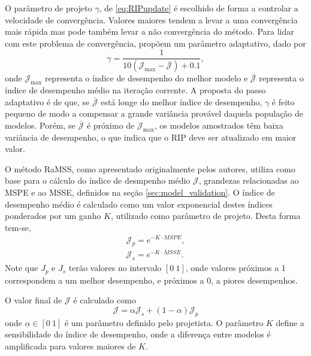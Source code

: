 O parâmetro de projeto $\gamma$, de  \eqref{eq:RIPupdate} é escolhido de forma a controlar a velocidade de convergência. Valores maiores tendem a levar a uma convergência mais rápida mas pode também levar a não convergência do método. Para lidar com este problema de convergência, \cite{falsone2015} propõem um parâmetro adaptativo, dado por
\begin{equation}
   \gamma = \frac{1}{10(\mathcal{J}_{\max}- \bar{\mathcal{J}}) + 0.1}, 
\label{eq:gamma}
\end{equation}
onde $\mathcal{J}_{\max}$ representa o índice de desempenho do melhor modelo e $\bar{\mathcal{J}}$ representa o índice de desempenho médio na iteração corrente.
A proposta do passo adaptativo é de que, se $\bar{\mathcal{J}}$ está longe do melhor índice de desempenho, $\gamma$ é feito pequeno de modo a compensar a grande variância provável daquela população de modelos. Porém, se  $\bar{\mathcal{J}}$ é próximo de $\mathcal{J}_{\max}$, os modelos amostrados têm baixa variância de desempenho, o que indica que o RIP deve ser atualizado em maior valor.

O método RaMSS, como apresentado originalmente pelos autores, utiliza como base para o cálculo do índice de desmpenho médio $\mathcal{J}$, grandezas relacionadas ao MSPE e ao MSSE, definidos na seção \ref{sec:model_validation}. O índice de desempenho médio é calculado como um valor exponencial destes índices ponderados por um ganho $K$, utilizado como parâmetro de projeto. Desta forma tem-se,
\begin{align}
  \mathcal{J}_p = e^{-K\cdot MSPE}, \label{eq:Jp} \\
  \mathcal{J}_s = e^{-K\cdot MSSE}. \label{eq:Js}
\end{align}
Note que $J_p$ e $J_s$ terão valores no intervalo $[0 \ 1]$, onde valores próximos a 1 correspondem a um melhor desempenho, e próximos a 0, a piores desempenhos.

O valor final de $\mathcal{J}$ é calculado como
\begin{equation}
  \mathcal{J} = \alpha \mathcal{J}_s + (1-\alpha)\mathcal{J}_p
\label{eq:Jcal}
\end{equation}
onde $\alpha \in [0 \ 1]$ é um parâmetro definido pelo projetista. O parâmetro $K$ define a sensibilidade do índice de desempenho, onde a diferença entre modelos é amplificada para valores maiores de $K$.




